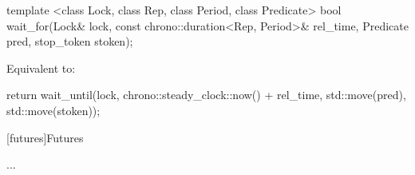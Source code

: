 {\begin{itemdecl}
template <class Lock, class Rep, class Period, class Predicate>
  bool wait_for(Lock& lock,
                const chrono::duration<Rep, Period>& rel_time,
                Predicate pred,
                stop_token stoken);
\end{itemdecl}
\begin{itemdescr}
 \pnum \effects Equivalent to:
\begin{codeblock}
return wait_until(lock, chrono::steady_clock::now() + rel_time, std::move(pred), std::move(stoken));
\end{codeblock}
\end{itemdescr}

}%


\vspace{5ex}

[futures]{Futures}

...

